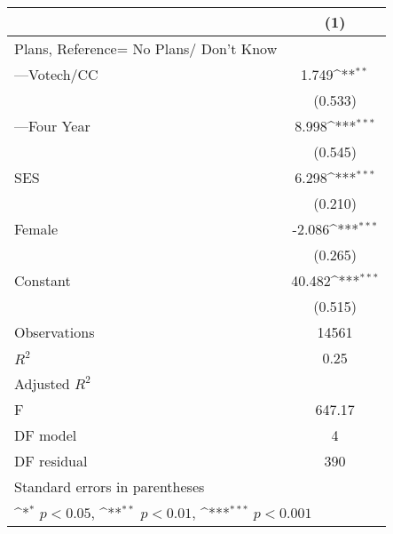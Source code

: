 {
\def\sym#1{\ifmmode^{#1}\else\(^{#1}\)\fi}
\begin{tabular}{l*{1}{c}}
\hline\hline
                                                  &\multicolumn{1}{c}{(1)}         \\
\hline
Plans, Reference= No Plans/ Don't Know            &                     \\
[1em]
---Votech/CC                                      &       1.749\sym{**} \\
                                                  &     (0.533)         \\
[1em]
---Four Year                                      &       8.998\sym{***}\\
                                                  &     (0.545)         \\
[1em]
SES                                               &       6.298\sym{***}\\
                                                  &     (0.210)         \\
[1em]
Female                                            &      -2.086\sym{***}\\
                                                  &     (0.265)         \\
[1em]
Constant                                          &      40.482\sym{***}\\
                                                  &     (0.515)         \\
\hline
Observations                                      &       14561         \\
\(R^{2}\)                                         &        0.25         \\
Adjusted \(R^{2}\)                                &                     \\
F                                                 &      647.17         \\
DF model                                          &           4         \\
DF residual                                       &         390         \\
\hline\hline
\multicolumn{2}{l}{\footnotesize Standard errors in parentheses}\\
\multicolumn{2}{l}{\footnotesize \sym{*} \(p<0.05\), \sym{**} \(p<0.01\), \sym{***} \(p<0.001\)}\\
\end{tabular}
}
